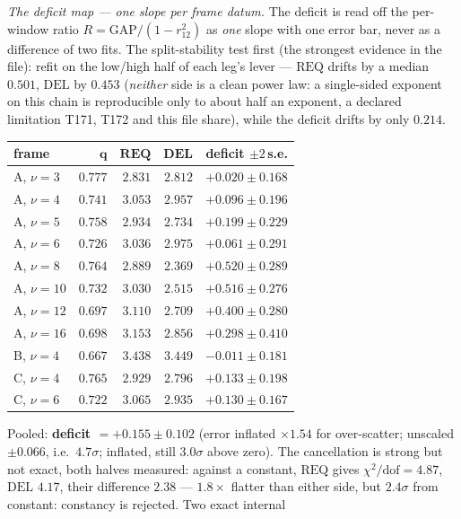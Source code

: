 \documentclass[11pt,a4paper]{article}
\begin{document}
\emph{The deficit map --- one slope per frame datum.} The deficit is
read off the per-window ratio $R=\mathrm{GAP}/(1-r_{12}^2)$ as
\emph{one} slope with one error bar, never as a difference of two fits.
The split-stability test first (the strongest evidence in the file):
refit on the low/high half of each leg's lever --- $\mathrm{REQ}$
drifts by a median $0.501$, $\mathrm{DEL}$ by $0.453$ (\emph{neither}
side is a clean power law: a single-sided exponent on this chain is
reproducible only to about half an exponent, a declared limitation
T171, T172 and this file share), while the deficit drifts by only
$0.214$.
\begin{center}\small
\begin{tabular}{@{}l r r r r@{}}
\toprule
\textbf{frame} & $\boldsymbol{q}$ & $\mathbf{REQ}$ & $\mathbf{DEL}$ &
\textbf{deficit} $\pm2$\,s.e.\\
\midrule
A, $\nu=3$ & $0.777$ & $2.831$ & $2.812$ & $+0.020\pm0.168$\\
A, $\nu=4$ & $0.741$ & $3.053$ & $2.957$ & $+0.096\pm0.196$\\
A, $\nu=5$ & $0.758$ & $2.934$ & $2.734$ & $+0.199\pm0.229$\\
A, $\nu=6$ & $0.726$ & $3.036$ & $2.975$ & $+0.061\pm0.291$\\
A, $\nu=8$ & $0.764$ & $2.889$ & $2.369$ & $+0.520\pm0.289$\\
A, $\nu=10$ & $0.732$ & $3.030$ & $2.515$ & $+0.516\pm0.276$\\
A, $\nu=12$ & $0.697$ & $3.110$ & $2.709$ & $+0.400\pm0.280$\\
A, $\nu=16$ & $0.698$ & $3.153$ & $2.856$ & $+0.298\pm0.410$\\
B, $\nu=4$ & $0.667$ & $3.438$ & $3.449$ & $-0.011\pm0.181$\\
C, $\nu=4$ & $0.765$ & $2.929$ & $2.796$ & $+0.133\pm0.198$\\
C, $\nu=6$ & $0.722$ & $3.065$ & $2.935$ & $+0.130\pm0.167$\\
\bottomrule
\end{tabular}
\end{center}
\noindent Pooled: \textbf{deficit $=+0.155\pm0.102$} (error inflated
$\times1.54$ for over-scatter; unscaled $\pm0.066$, i.e.\ $4.7\sigma$;
inflated, still $3.0\sigma$ above zero). The cancellation is strong but
not exact, both halves measured: against a constant, $\mathrm{REQ}$
gives $\chi^2/\mathrm{dof}=4.87$, $\mathrm{DEL}$ $4.17$, their
difference $2.38$ --- $1.8\times$ flatter than either side, but $2.4
\sigma$ from constant: constancy is rejected. Two exact internal
\end{document}
